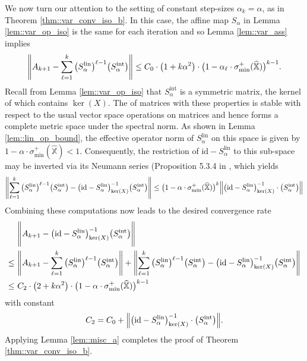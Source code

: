 \documentclass{article}
\newcommand*{\bbX}{\mathbb{X}}
\newcommand*{\inv}{^{-1}}
\newcommand*{\sigminp}{\sigma_{\mathrm{min}}^+}
\DeclarePairedDelimiter{\norm}{\lVert}{\rVert}
\newcommand*{\id}{\mathrm{id}}
\newcommand{\whbbX}{\widehat{\bbX}}
\newcommand{\Slin}{S^{\mathrm{lin}}}
\newcommand{\Sint}{S^{\mathrm{int}}}
\begin{document}
We now turn our attention to the setting of constant step-sizes $\alpha_k =
\alpha$, as in Theorem \ref{thm::var_conv_iso_b}. In this case, the affine map
$S_{\alpha}$ in Lemma \ref{lem::var_op_iso} is the same for each iteration and
so Lemma \ref{lem::var_ass} implies \begin{align*}
  \norm[\Bigg]{A_{k + 1} - \sum_{\ell = 1}^k \big(\Slin_\alpha\big)^{\ell - 1}
  \big(\Sint_\alpha\big)} \leq C_0 \cdot \big(1 + k \alpha^2\big) \cdot \big(1
  - \alpha_\ell \cdot \sigminp(\whbbX)\big)^{k - 1}.
\end{align*} Recall from Lemma \ref{lem::var_op_iso} that $\Sint_\alpha$ is a
symmetric matrix, the kernel of which contains $\ker(X)$. The of matrices with
these properties is stable with respect to the usual vector space operations on
matrices and hence forms a complete metric space under the spectral norm. As
shown in Lemma \ref{lem::lin_op_bound}, the effective operator norm of
$\Slin_\alpha$ on this space is given by $1 - \alpha \cdot \sigminp(\whbbX) <
1$. Consequently, the restriction of $\id - \Slin_\alpha$ to this sub-space may
be inverted via its Neumann series (Proposition 5.3.4 in \cite{helemskii_2006},
which yields \begin{align*}
  \norm*{\sum_{\ell = 1}^k \big(\Slin_\alpha\big)^{\ell - 1}
  \big(\Sint_\alpha\big) - \big(\id - \Slin_\alpha\big)\inv_{\ker(X)}
  \big(\Sint_\alpha\big)} \leq \big(1 - \alpha \cdot \sigminp(\whbbX)\big)^k
  \norm[\Big]{\big(\id - \Slin_\alpha\big)\inv_{\ker(X)} \cdot
  \big(\Sint_\alpha\big)}
\end{align*} Combining these computations now leads to the desired convergence
rate \begin{align*}
  &\norm[\Bigg]{A_{k + 1} - \big(\id - \Slin_\alpha\big)\inv_{\ker(X)}
  \big(\Sint_\alpha\big)}\\
  \leq\ &\norm[\Bigg]{A_{k + 1} - \sum_{\ell = 1}^k \big(\Slin_\alpha\big)^{\ell
  - 1} \big(\Sint_\alpha\big)} + \norm*{\sum_{\ell = 1}^k
  \big(\Slin_\alpha\big)^{\ell - 1} \big(\Sint_\alpha\big) - \big(\id -
  \Slin_\alpha\big)\inv_{\ker(X)} \big(\Sint_\alpha\big)}\\
  \leq\ &C_2 \cdot \big(2 + k \alpha^2\big) \cdot \big(1 - \alpha \cdot
  \sigminp(\whbbX)\big)^{k - 1}
\end{align*} with constant \begin{align*}
  C_2 = C_0 + \norm[\Big]{\big(\id - \Slin_\alpha\big)\inv_{\ker(X)} \cdot
  \big(\Sint_\alpha\big)}.
\end{align*} Applying Lemma \ref{lem::misc_a} completes the proof of Theorem
\ref{thm::var_conv_iso_b}.
\end{document}
